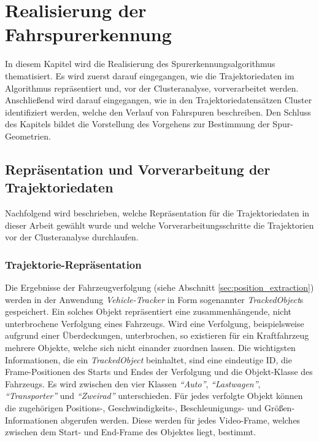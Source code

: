 
\chapter{Realisierung der Fahrspurerkennung}
\label{cha:realisation}

In diesem Kapitel wird die Realisierung des Spurerkennungsalgorithmus thematisiert.
Es wird zuerst darauf eingegangen, wie die Trajektoriedaten im Algorithmus repräsentiert
und, vor der Clusteranalyse, vorverarbeitet werden.
Anschließend wird darauf eingegangen, wie in den Trajektoriedatensätzen Cluster identifiziert werden,
welche den Verlauf von Fahrspuren beschreiben.
Den Schluss des Kapitels bildet die Vorstellung des Vorgehens zur Bestimmung der Spur-Geometrien.

\section{Repräsentation und Vorverarbeitung der Trajektoriedaten}
\label{cha:realisation_clustering}

Nachfolgend wird beschrieben, welche Repräsentation für die Trajektoriedaten in dieser Arbeit gewählt
wurde und welche Vorverarbeitungsschritte die Trajektorien vor der Clusteranalyse durchlaufen.

\subsection{Trajektorie-Repräsentation}

Die Ergebnisse der Fahrzeugverfolgung (siehe Abschnitt \ref{sec:position_extraction}) werden
in der Anwendung \textit{Vehicle-Tracker} in Form sogenannter \textit{TrackedObject}s gespeichert.
Ein solches Objekt repräsentiert eine zusammenhängende, nicht unterbrochene Verfolgung eines Fahrzeugs.
Wird eine Verfolgung, beispielsweise aufgrund einer Überdeckungen, unterbrochen, so existieren für ein
Kraftfahrzeug mehrere Objekte, welche sich nicht einander zuordnen lassen.
Die wichtigsten Informationen, die ein \textit{TrackedObject} beinhaltet, sind eine eindeutige ID,
die Frame-Positionen des Starts und Endes der Verfolgung und die Objekt-Klasse des Fahrzeugs. Es wird
zwischen den vier Klassen \textit{``Auto''}, \textit{``Lastwagen''}, \textit{``Transporter''}
und \textit{``Zweirad''} unterschieden.
Für jedes verfolgte Objekt können die zugehörigen Positions-, Geschwindigkeits-, Beschleunigungs-
und Größen-Informationen abgerufen werden. Diese werden für jedes Video-Frame, welches zwischen dem Start-
und End-Frame des Objektes liegt, bestimmt.


